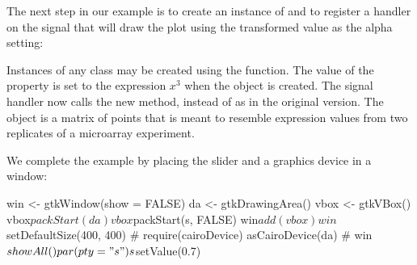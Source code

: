 The next step in our example is to create an instance of
 and to register a handler on the
 signal that will draw the plot using the
transformed value as the alpha setting:
\begin{Schunk}
\end{Schunk}
%
Instances of any  class may be created using the
 function.  The value of the  property is set
to the  expression $x^3$ when the object is created.  The
signal handler now calls the new  method,
instead of  as in the original version.  The
 object is a matrix of points that is meant to resemble
expression values from two replicates of a microarray experiment.

We complete the example by placing the slider and a graphics device in
a window:
\begin{Schunk}
\begin{Sinput}
 win <- gtkWindow(show = FALSE)
 da <- gtkDrawingArea()
 vbox <- gtkVBox()
 vbox$packStart(da)
 vbox$packStart(s, FALSE)
 win$add(vbox)
 win$setDefaultSize(400, 400)
 #
 require(cairoDevice)
 asCairoDevice(da)
 #
 win$showAll()
 par(pty = "s")
 s$setValue(0.7)
\end{Sinput}
\end{Schunk}






